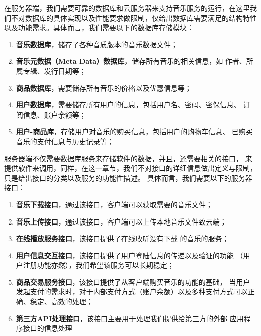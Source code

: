 在服务器端，我们需要可靠的数据库和云服务器来支持音乐服务的运行，在这里我们不对数据库的具体实现以及性能要求做限制，仅给出数据库需要满足的结构特性以及功能需求。具体而言，我们需要以下的数据库存储模块：
    \begin{enumerate}
        \item \textbf{音乐数据库}，储存了各种音质版本的音乐数据文件；
        \item \textbf{音乐元数据（Meta Data）数据库}，储存所有音乐的相关信息，如
            作者、所属专辑、发行日期等；
        \item \textbf{商品数据库}，需要储存所有音乐的价格以及优惠信息等；
        \item \textbf{用户数据库}，需要储存所有用户的信息，包括用户名、密码、密保信息、
            订阅信息、账户余额等；
\iffalse
    \R{
        \item \textbf{用户-用户关系数据库}
                    ，存储用户与用户之间的联系，
            具体而言，储存了用户之间的社交关系，比如好友关系、关注关系、粉丝关系等。
}
\fi
        \item \textbf{用户-商品库}，存储用户对音乐的购买信息，包括用户的购物车信息、
            已购买音乐的支付信息与历史记录等；
    \end{enumerate}

服务器端不仅需要数据库服务来存储软件的数据，并且，还需要相关的接口，
    来提供软件来调用，同样，在这一章节，我们不对接口的详细信息做出定义与限制，
    只是给出接口的分类以及服务的功能性描述。
具体而言，我们需要以下的服务器接口：
\begin{enumerate}
    \item \textbf{音乐下载接口}，通过该接口，客户端可以获取需要的音乐文件；
    \item \textbf{音乐上传接口}，通过该接口，客户端可以上传本地音乐文件致云端；
\iffalse
        \R{
        介于新的需求，我们需要在下载时，进行不同音质的音乐分配。
        并且，根据用户会员的购买情况，音乐的可下载性、可下载的音质都有一定区别。
        }
\fi
    \item \textbf{在线播放服务接口}，该接口提供了在线收听没有下载
        的音乐的服务；
\iffalse
        \R{
        介于新的需求，我们同样需要在流播放的过程中进行音质的配置。
        并且，根据用户会员的购买情况，不同音质的可用性将有一定区别。
        }
\fi
    \item \textbf{用户信息交互接口}，该接口提供了用户登陆信息的传递以及验证的功能
        （用户注册功能亦然），我们希望该服务可以长期稳定；
    \item \textbf{商品交易服务接口}，该接口提供了从客户端购买音乐的功能的基础，
        当用户发起支付的需求时，对于内部支付方式（账户余额）以及多种支付方式可以正确、稳定、高效的处理；
    \item \textbf{第三方API处理接口}，该接口主要用于处理我们提供给第三方的外部
        应用程序接口的信息处理
\end{enumerate}


